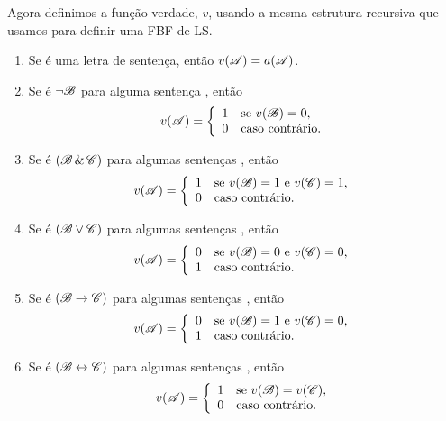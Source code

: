 Agora definimos a função verdade, $v$, usando a mesma estrutura recursiva que usamos para definir uma FBF de LS.

\begin{enumerate}
\item Se  é uma letra de sentença, então $v(\mathscr{A})=a(\mathscr{A})$.

\item Se  é ${\neg}\mathscr{B}$ para alguma sentença , então
\begin{displaymath}v(\mathscr{A}) =
	\left\{\begin{array}{ll}
	1 & \mbox{se $v(\mathscr{B}) = 0$},\\
	0 & \mbox{caso contrário.}
	\end{array}\right.
\end{displaymath}

\item Se  é $(\mathscr{B}\,\&\,\mathscr{C})$ para algumas sentenças , então
\begin{displaymath}v(\mathscr{A}) =
	\left\{\begin{array}{ll}
	1 & \mbox{se $v(\mathscr{B}) = 1$ e $v(\mathscr{C}) = 1$,}\\
	0 & \mbox{caso contrário.}
	\end{array}\right.
\end{displaymath}

\item Se  é $(\mathscr{B}\vee\mathscr{C})$ para algumas sentenças , então
\begin{displaymath}v(\mathscr{A}) =
	\left\{\begin{array}{ll}
	0 & \mbox{se $v(\mathscr{B}) = 0$ e $v(\mathscr{C}) = 0$,}\\
	1 & \mbox{caso contrário.}
	\end{array}\right.
\end{displaymath}

\item Se  é $(\mathscr{B}\rightarrow\mathscr{C})$ para algumas sentenças , então
\begin{displaymath}v(\mathscr{A}) =
	\left\{\begin{array}{ll}
	0 & \mbox{se $v(\mathscr{B}) = 1$ e $v(\mathscr{C}) = 0$,}\\
	1 & \mbox{caso contrário.}
	\end{array}\right.
\end{displaymath}

\item Se  é $(\mathscr{B}\leftrightarrow\mathscr{C})$ para algumas sentenças , então
\begin{displaymath}v(\mathscr{A}) =
	\left\{\begin{array}{ll}
	1 & \mbox{se $v(\mathscr{B}) = v(\mathscr{C})$},\\
	0 & \mbox{caso contrário.}
	\end{array}\right.
\end{displaymath}
\end{enumerate}

